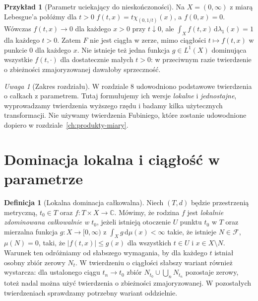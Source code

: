\documentclass[11pt,a4paper,oneside]{book}
\numberwithin{equation}{chapter}
\theoremstyle{plain}
\theoremstyle{definition}
\newtheorem{definicja}[twierdzenie]{Definicja}
\newtheorem{przyklad}[twierdzenie]{Przykład}
\theoremstyle{remark}
\newtheorem{uwaga}[twierdzenie]{Uwaga}
\begin{document}
\begin{przyklad}[Parametr uciekający do nieskończoności]
\label{ex:params-escape-11}
Na $X=(0,\infty)$ z miarą Lebesgue'a połóżmy dla $t>0$
$f(t,x)=t\chi_{(0,1/t)}(x)$, a $f(0,x)=0$.
Wówczas $f(t,x)\to0$ dla każdego $x>0$ przy $t\downarrow0$,
ale $\int_X f(t,x)\,\mathrm d\lambda_1(x)=1$ dla każdego $t>0$.
Zatem $F$ nie jest ciągła w zerze, mimo ciągłości $t\mapsto f(t,x)$
w punkcie $0$ dla każdego $x$. Nie istnieje też jedna funkcja
$g\in L^1(X)$ dominująca wszystkie $f(t,\cdot)$ dla dostatecznie
małych $t>0$: w przeciwnym razie twierdzenie o zbieżności
zmajoryzowanej dawałoby sprzeczność.
\end{przyklad}

\begin{uwaga}[Zakres rozdziału]
W rozdziale 8 udowodniono podstawowe twierdzenia o całkach z parametrem.
Tutaj formułujemy ich wersje \emph{lokalne} i \emph{jednostajne},
wyprowadzamy twierdzenia wyższego rzędu i badamy kilka użytecznych
transformacji. Nie używamy twierdzenia Fubiniego, które zostanie
udowodnione dopiero w rozdziale~\ref{ch:produkty-miary}.
\end{uwaga}

\section{Dominacja lokalna i ciągłość w parametrze}

\begin{definicja}[Lokalna dominacja całkowalna]
\label{def:local-majorant-11}
Niech $(T,d)$ będzie przestrzenią metryczną, $t_0\in T$ oraz
$f:T\times X\to\mathbb C$. Mówimy, że rodzina $f$ jest
\emph{lokalnie zdominowana całkowalnie w $t_0$}, jeżeli istnieją
otoczenie $U$ punktu $t_0$ w $T$ oraz mierzalna funkcja
$g:X\to[0,\infty)$ z $\int_Xg\,\mathrm d\mu(x)<\infty$ takie, że
istnieje $N\in\mathcal F$, $\mu(N)=0$, taki, że
$|f(t,x)|\le g(x)$ dla wszystkich $t\in U$ i $x\in X\setminus N$.
Warunek ten odróżniamy od słabszego wymagania, by dla każdego $t$
istniał osobny zbiór zerowy $N_t$. W twierdzeniu o ciągłości
słabszy wariant również wystarcza: dla ustalonego ciągu
$t_n\to t_0$ zbiór $N_{t_0}\cup\bigcup_n N_{t_n}$
pozostaje zerowy, toteż nadal można użyć twierdzenia
o zbieżności zmajoryzowanej. W pozostałych twierdzeniach
sprawdzamy potrzebny wariant oddzielnie.
\end{definicja}
\end{document}
